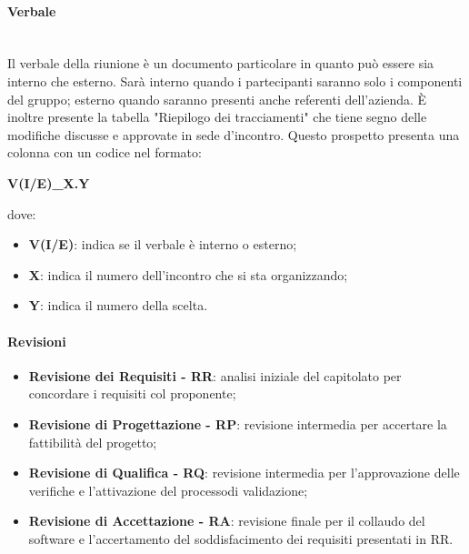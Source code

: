                 \paragraph{Verbale}\mbox{}\\ [1mm]
                    Il verbale della riunione è un documento particolare in quanto può essere sia interno che esterno. Sarà interno quando
                    i partecipanti saranno solo i componenti del gruppo; esterno quando saranno presenti anche referenti dell'azienda.
                    È inoltre presente la tabella "Riepilogo dei tracciamenti" che tiene segno delle modifiche discusse e
                    approvate in sede d'incontro. Questo prospetto presenta una colonna con un codice nel formato: \newline \newline
                    \centerline{\textbf{V(I/E)\_X.Y}} \newline \newline
                    dove:
                    \begin{itemize}
                        \item \textbf{V(I/E)}: indica se il verbale è interno o esterno;
                        \item \textbf{X}: indica il numero dell'incontro che si sta organizzando;
                        \item \textbf{Y}: indica il numero della scelta.
                    \end{itemize}
                \paragraph{Revisioni}
                \begin{itemize}
                    \item \textbf{Revisione dei Requisiti - RR}: analisi iniziale del capitolato per concordare i requisiti col proponente;
                    \item \textbf{Revisione di Progettazione - RP}: revisione intermedia per accertare la fattibilità del progetto\glo;
                    \item \textbf{Revisione di Qualifica - RQ}: revisione intermedia per l'approvazione delle verifiche e l'attivazione del processo\glosp di validazione;
                    \item \textbf{Revisione di Accettazione - RA}: revisione finale per il collaudo del software e l'accertamento del soddisfacimento dei requisiti presentati in RR.
                \end{itemize}
